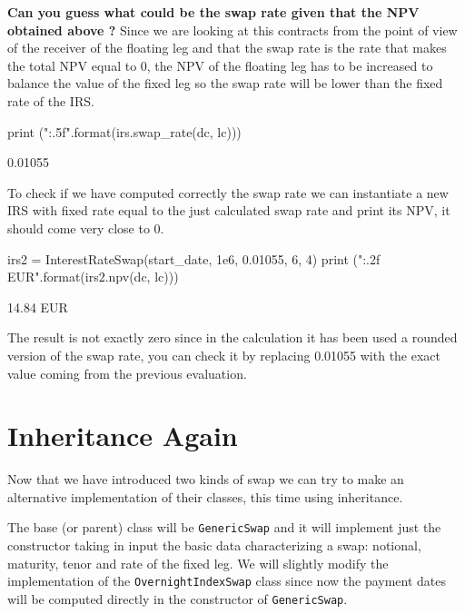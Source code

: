 \textbf{Can you guess what could be the \textbf{swap rate} given that the NPV obtained above ?}
Since we are looking at this contracts from the point of view of the receiver of the floating leg and that the swap rate is the rate that makes the total NPV equal to 0, the NPV of the floating leg has to be increased to balance the value of the fixed leg so the swap rate will be lower than the fixed rate of the IRS.

\begin{ipython}
print ("{:.5f}".format(irs.swap_rate(dc, lc)))
\end{ipython}
\begin{ioutput}
0.01055
\end{ioutput}
    
To check if we have computed correctly the swap rate we can instantiate a new IRS with fixed rate equal to the just calculated swap rate and print its NPV, it should come very close to 0.

\begin{ipython}
irs2 = InterestRateSwap(start_date, 1e6, 0.01055, 6, 4)
print ("{:.2f} EUR".format(irs2.npv(dc, lc)))
\end{ipython}
\begin{ioutput}
14.84 EUR
\end{ioutput}
The result is not exactly zero since in the calculation it has been used a rounded version of the swap rate, you can check it by replacing 0.01055 with the exact value coming from the previous evaluation. 
   
\section{Inheritance Again}
Now that we have introduced two kinds of swap we can try to make an alternative implementation of their classes, this time using inheritance.

The base (or parent) class will be \texttt{GenericSwap} and it will implement just the constructor taking in input the basic data characterizing a swap: notional, maturity, tenor and rate of the fixed leg. We will slightly modify the implementation of the \texttt{OvernightIndexSwap} class since now the payment dates will be computed directly in the constructor of \texttt{GenericSwap}.

